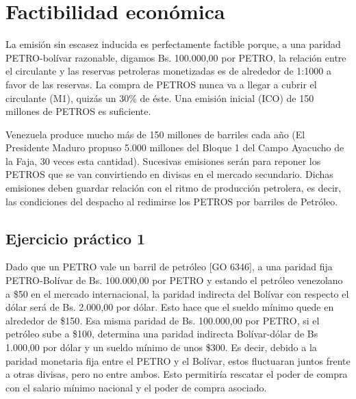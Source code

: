 %
\section{Factibilidad económica}
\label{sec:fact}
%
La emisión sin escasez inducida es perfectamente factible porque, a una paridad PETRO-bolívar razonable, digamos Bs. 100.000,00 por PETRO, la relación entre el circulante y las reservas petroleras monetizadas es de alrededor de 1:1000 a favor de las reservas. La compra de PETROS nunca va a llegar a cubrir el circulante (M1), quizás un 30\% de éste. Una emisión inicial (ICO) de 150 millones de PETROS es suficiente.

Venezuela produce mucho más de 150 millones de barriles cada año (El Presidente Maduro propuso 5.000 millones del Bloque 1 del Campo Ayacucho de la Faja, 30 veces esta cantidad). Sucesivas emisiones serán para reponer los PETROS que se van convirtiendo en divisas en el mercado secundario. Dichas emisiones deben guardar relación con el ritmo de producción petrolera, es decir, las condiciones del despacho al redimirse los PETROS por barriles de Petróleo.
%
\subsection{Ejercicio práctico 1}
%
Dado que un PETRO vale un barril de petróleo [GO 6346], a una paridad fija PETRO-Bolívar de Bs. 100.000,00 por PETRO y estando el petróleo venezolano a \$50 en el mercado internacional, la paridad indirecta del Bolívar con respecto el dólar será de Bs. 2.000,00 por dólar. Esto hace que el sueldo mínimo quede en alrededor de \$150. Esa misma paridad de Bs. 100.000,00 por PETRO, si el petróleo sube a \$100, determina una paridad indirecta Bolívar-dólar de Bs 1.000,00 por dólar y un sueldo mínimo de unos \$300. Es decir, debido a la paridad monetaria fija entre el PETRO y el Bolívar, estos fluctuaran juntos frente a otras divisas, pero no entre ambos. Esto permitiría rescatar el poder de compra con el salario mínimo nacional y el poder de compra asociado.
